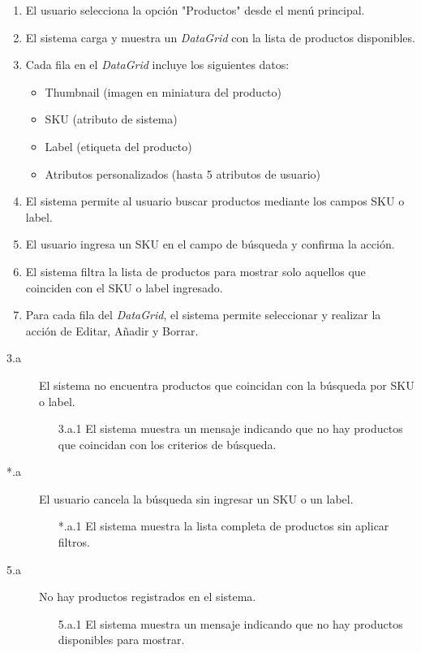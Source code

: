 \begin{enumerate}
    \item El usuario selecciona la opción "Productos" desde el menú principal.
    \item El sistema carga y muestra un \textit{DataGrid} con la lista de productos disponibles.
    \item Cada fila en el \textit{DataGrid} incluye los siguientes datos:
    \begin{itemize}
        \item Thumbnail (imagen en miniatura del producto)
        \item SKU (atributo de sistema)
        \item Label (etiqueta del producto)
        \item Atributos personalizados (hasta 5 atributos de usuario)
    \end{itemize}
    \item El sistema permite al usuario buscar productos mediante los campos SKU o label.
    \item El usuario ingresa un SKU en el campo de búsqueda y confirma la acción.
    \item El sistema filtra la lista de productos para mostrar solo aquellos que coinciden con el SKU o label ingresado.
    \item Para cada fila del \textit{DataGrid}, el sistema permite seleccionar y realizar la acción de Editar, Añadir y Borrar.
\end{enumerate}

\begin{description}
    \item[3.a] El sistema no encuentra productos que coincidan con la búsqueda por SKU o label.
    \begin{enumerate}
        \item[3.a.1] El sistema muestra un mensaje indicando que no hay productos que coincidan con los criterios de búsqueda.
    \end{enumerate}

    \item[*.a] El usuario cancela la búsqueda sin ingresar un SKU o un label.
    \begin{enumerate}
        \item[*.a.1] El sistema muestra la lista completa de productos sin aplicar filtros.
    \end{enumerate}

    \item[5.a] No hay productos registrados en el sistema.
    \begin{enumerate}
        \item[5.a.1] El sistema muestra un mensaje indicando que no hay productos disponibles para mostrar.
    \end{enumerate}
\end{description}

